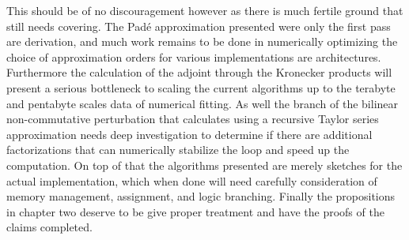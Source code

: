 This should be of no discouragement however as there is much fertile ground that still needs
covering. The Pad\'{e} approximation presented were only the first pass are derivation, and
much work remains to be done in numerically optimizing the choice of approximation orders
for various implementations are architectures. Furthermore the calculation of the adjoint
through the Kronecker products will present a serious bottleneck to scaling the current
algorithms up to the terabyte and pentabyte scales data of numerical fitting. As well the 
branch of the bilinear non-commutative perturbation that calculates using a recursive Taylor
series approximation needs deep investigation to determine if there are additional
factorizations that can numerically stabilize the loop and speed up the computation. On top
of that the algorithms presented are merely sketches for the actual implementation, which
when done will need carefully consideration of memory management, assignment, and logic
branching. Finally the propositions in chapter two deserve to be give proper treatment and
have the proofs of the claims completed.